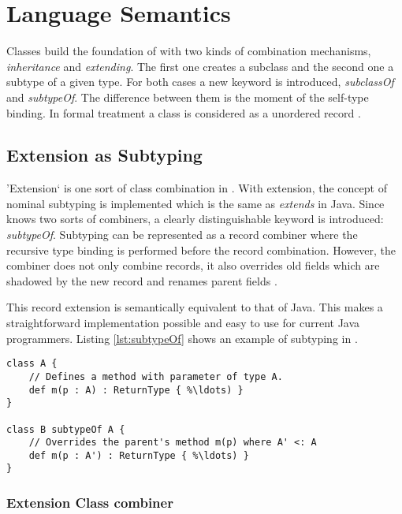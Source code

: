 \section{Language Semantics}
Classes build the foundation of \ooplss with two kinds of combination mechanisms, 
\emph{inheritance} and \emph{extending}. The
first one creates a subclass and the second one a subtype of a given
type. For both cases a new keyword is introduced, \emph{subclassOf}
and \emph{subtypeOf}. The difference between them is the moment of
the self-type binding. In formal treatment a class is considered as a
unordered record \cite{simons_theory_2002-1}.

\subsection{Extension as Subtyping}
'Extension` is one sort of class combination in \ooplss. With extension, the concept
of nominal subtyping is implemented which is the same as \emph{extends} in Java.
Since \ooplss knows two sorts of combiners, a clearly distinguishable keyword is
introduced: \emph{subtypeOf}. Subtyping can be represented as a record combiner
where the recursive type binding is performed before the record combination.
However, the combiner does not only combine records, it also overrides 
old fields which are shadowed by the new record and renames parent
fields \cite{simons_theory_2003-2}.

This record extension is semantically equivalent to that of Java. This
makes a straightforward implementation possible and easy to use for
current Java programmers. Listing \ref{lst:subtypeOf} shows an example
of subtyping in \ooplss.

\begin{lstlisting}[float,language=ooplss,caption=Subtyping in \ooplss,label=lst:subtypeOf]
class A {
	// Defines a method with parameter of type A.
	def m(p : A) : ReturnType { %\ldots) }
}

class B subtypeOf A {
	// Overrides the parent's method m(p) where A' <: A
	def m(p : A') : ReturnType { %\ldots) }
}
\end{lstlisting}


\subsubsection{Extension Class combiner}

